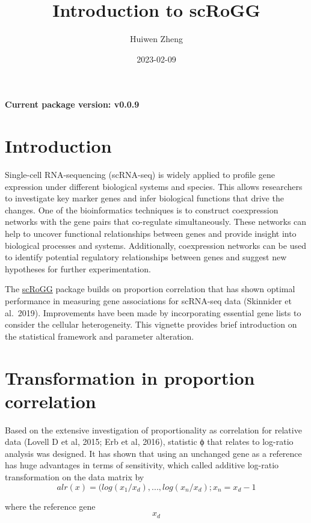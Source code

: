 \documentclass[
]{article}
\title{Introduction to scRoGG}
\author{Huiwen Zheng}
\date{2023-02-09}
\begin{document}
\maketitle

\textbf{Current package version: v0.0.9}

\hypertarget{introduction}{%
\section{Introduction}\label{introduction}}

Single-cell RNA-sequencing (scRNA-seq) is widely applied to profile gene
expression under different biological systems and species. This allows
researchers to investigate key marker genes and infer biological
functions that drive the changes. One of the bioinformatics techniques
is to construct coexpression networks with the gene pairs that
co-regulate simultaneously. These networks can help to uncover
functional relationships between genes and provide insight into
biological processes and systems. Additionally, coexpression networks
can be used to identify potential regulatory relationships between genes
and suggest new hypotheses for further experimentation.

The \href{https://github.com/huiwenzh/scRoGG}{scRoGG} package builds on
proportion correlation that has shown optimal performance in measuring
gene associations for scRNA-seq data (Skinnider et al.~2019).
Improvements have been made by incorporating essential gene lists to
consider the cellular heterogeneity. This vignette provides brief
introduction on the statistical framework and parameter alteration.

\hypertarget{transformation-in-proportion-correlation}{%
\section{Transformation in proportion
correlation}\label{transformation-in-proportion-correlation}}

Based on the extensive investigation of proportionality as correlation
for relative data (Lovell D et al, 2015; Erb et al, 2016), statistic ϕ
that relates to log-ratio analysis was designed. It has shown that using
an unchanged gene as a reference has huge advantages in terms of
sensitivity, which called additive log-ratio transformation on the data
matrix by \[ 
alr(x) = (log(x_1/x_d),...,log(x_n/x_d); x_n = x_d -1
\]

where the reference gene \[ x_d \]
\end{document}
